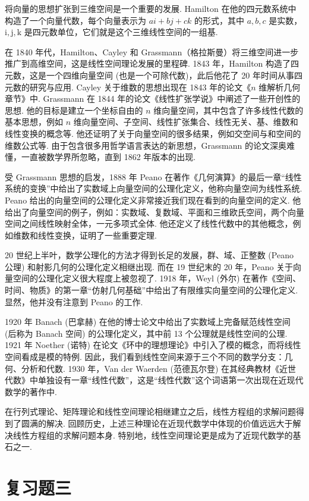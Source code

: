 \documentclass[UTF8, 12pt, fontset=fandol, oneside]{ctexart}
\begin{document}
将向量的思想扩张到三维空间是一个重要的发展. Hamilton 在他的四元数系统中构造了一个向量代数，每个向量表示为 $ai+bj+ck$ 的形式，其中 $a,b,c$ 是实数，$\mathrm{i},\mathrm{j},\mathrm{k}$ 是四元数单位，它们就是这个三维线性空间的一组基.

在 1840 年代，Hamilton、Cayley 和 Grassmann（格拉斯曼）将三维空间进一步推广到高维空间，这是线性空间理论发展的里程碑. 1843 年，Hamilton 构造了四元数，这是一个四维向量空间 (也是一个可除代数)，此后他花了 20 年时间从事四元数的研究与应用. Cayley 关于维数的思想出现在 1843 年的论文《$n$ 维解析几何章节》中. Grassmann 在 1844 年的论文《线性扩张学说》中阐述了一些开创性的思想. 他的目标是建立一个坐标自由的 $n$ 维向量空间，其中包含了许多线性代数的基本思想，例如 $n$ 维向量空间、子空间、线性扩张集合、线性无关、基、维数和线性变换的概念等. 他还证明了关于向量空间的很多结果，例如交空间与和空间的维数公式等. 由于包含很多用哲学语言表达的新思想，Grassmann 的论文深奥难懂，一直被数学界所忽略，直到 1862 年版本的出现.

受 Grassmann 思想的启发，1888 年 Peano 在著作《几何演算》的最后一章“线性系统的变换”中给出了实数域上向量空间的公理化定义，他称向量空间为线性系统. Peano 给出的向量空间的公理化定义非常接近我们现在看到的向量空间的定义. 他给出了向量空间的例子，例如：实数域、复数域、平面和三维欧氏空间，两个向量空间之间线性映射全体，一元多项式全体. 他还定义了线性代数中的其他概念，例如维数和线性变换，证明了一些重要定理.

20 世纪上半叶，数学公理化的方法才得到长足的发展，群、域、正整数 (Peano 公理) 和射影几何的公理化定义相继出现. 而在 19 世纪末的 20 年，Peano 关于向量空间的公理化定义很大程度上被忽视了. 1918 年，Weyl (外尔) 在著作《空间、时间、物质》的第一章“仿射几何基础”中给出了有限维实向量空间的公理化定义. 显然，他并没有注意到 Peano 的工作.

1920 年 Banach (巴拿赫) 在他的博士论文中给出了实数域上完备赋范线性空间 (后称为 Banach 空间) 的公理化定义，其中前 13 个公理就是线性空间的公理. 1921 年 Noether (诺特) 在论文《环中的理想理论》中引入了模的概念，而将线性空间看成是模的特例. 因此，我们看到线性空间来源于三个不同的数学分支：几何、分析和代数. 1930 年，Van der Waerden (范德瓦尔登) 在其经典教材《近世代数》中单独设有一章“线性代数”，这是“线性代数”这个词语第一次出现在近现代数学的著作中.

在行列式理论、矩阵理论和线性空间理论相继建立之后，线性方程组的求解问题得到了圆满的解决. 回顾历史，上述三种理论在近现代数学中体现的价值远远大于解决线性方程组的求解问题本身. 特别地，线性空间理论更是成为了近现代数学的基石之一.

\section*{复习题三}
\end{document}
